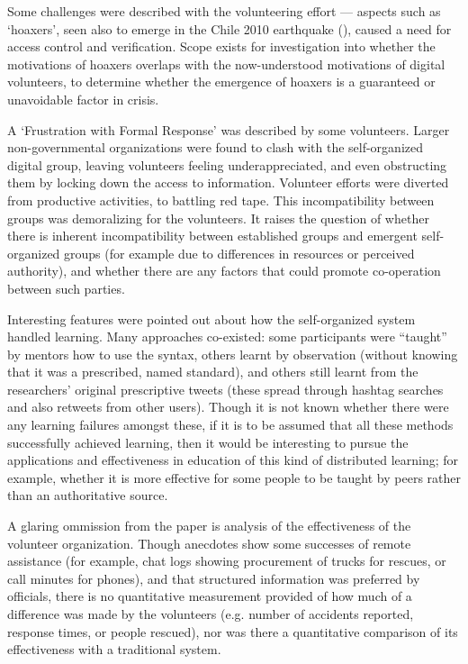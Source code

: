 \documentclass[a4paper,12pt]{article}
\begin{document}
Some challenges were described with the volunteering effort --- aspects such as `hoaxers', seen also to emerge in the Chile 2010 earthquake (\cite{mendoza2010twitter}), caused a need for access control and verification. Scope exists for investigation into whether the motivations of hoaxers overlaps with the now-understood motivations of digital volunteers, to determine whether the emergence of hoaxers is a guaranteed or unavoidable factor in crisis.

A `Frustration with Formal Response' was described by some volunteers. Larger non-governmental organizations were found to clash with the self-organized digital group, leaving volunteers feeling underappreciated, and even obstructing them by locking down the access to information. Volunteer efforts were diverted from productive activities, to battling red tape. This incompatibility between groups was demoralizing for the volunteers. It raises the question of whether there is inherent incompatibility between established groups and emergent self-organized groups (for example due to differences in resources or perceived authority), and whether there are any factors that could promote co-operation between such parties.

Interesting features were pointed out about how the self-organized system handled learning. Many approaches co-existed: some participants were ``taught'' by mentors how to use the syntax, others learnt by observation (without knowing that it was a prescribed, named standard), and others still learnt from the researchers' original prescriptive tweets (these spread through hashtag searches and also retweets from other users). Though it is not known whether there were any learning failures amongst these, if it is to be assumed that all these methods successfully achieved learning, then it would be interesting to pursue the applications and effectiveness in education of this kind of distributed learning; for example, whether it is more effective for some people to be taught by peers rather than an authoritative source.

A glaring ommission from the paper is analysis of the effectiveness of the volunteer organization. Though anecdotes show some successes of remote assistance (for example, chat logs showing procurement of trucks for rescues, or call minutes for phones), and that structured information was preferred by officials, there is no quantitative measurement provided of how much of a difference was made by the volunteers (e.g. number of accidents reported, response times, or people rescued), nor was there a quantitative comparison of its effectiveness with a traditional system. 


%
%
\printbibliography
\end{document}
